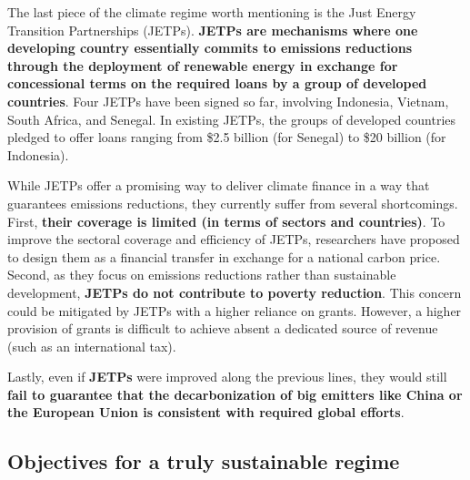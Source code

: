 \documentclass[12pt,english]{article}
\begin{document}
The last piece of the climate regime worth mentioning is the Just Energy Transition Partnerships (JETPs).\textbf{ JETPs are mechanisms where one developing country essentially commits to emissions reductions through the deployment of renewable energy in exchange for concessional terms on the required loans by a group of developed countries}. Four JETPs have been signed so far, involving Indonesia, Vietnam, South Africa, and Senegal.\cite{ha-duong_just_2023} In existing JETPs, the groups of developed countries pledged to offer loans ranging from \$2.5 billion (for Senegal) to \$20 billion (for Indonesia). 

While JETPs offer a promising way to deliver climate finance in a way that guarantees emissions reductions, they currently suffer from several shortcomings. First, \textbf{their coverage is limited (in terms of sectors and countries)}. To improve the sectoral coverage and efficiency of JETPs, researchers have proposed to design them as a financial transfer in exchange for a national carbon price.\cite{steckel_climate_2017} Second, as they focus on emissions reductions rather than sustainable development, \textbf{JETPs do not contribute to poverty reduction}. This concern could be mitigated by JETPs with a higher reliance on grants.\cite{bolton_why_2025} However, a higher provision of grants is difficult to achieve absent a dedicated source of revenue (such as an international tax).

Lastly, even if \textbf{JETPs} were improved along the previous lines, they would still \textbf{fail to guarantee that the decarbonization of big emitters like China or the European Union is consistent with required global efforts}. 


\subsection{Objectives for a truly sustainable regime\label{subsec:objectives}}
\end{document}
